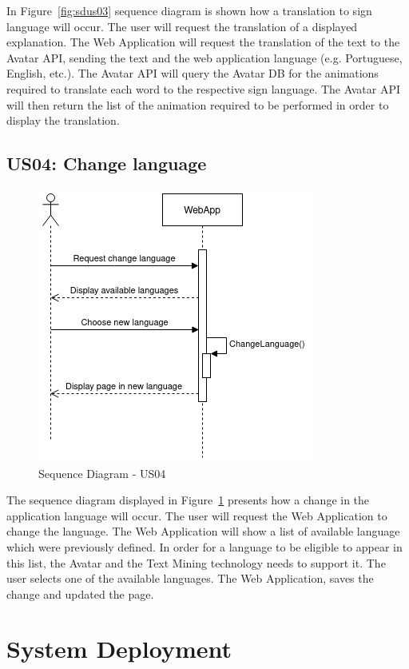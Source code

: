 In Figure~\ref{fig:sdus03} sequence diagram is shown how a translation to sign language will occur.
The user will request the translation of a displayed explanation.
The Web Application will request the translation of the text to the Avatar API, sending the text and the web application language (e.g. Portuguese, English, etc.).
The Avatar API will query the Avatar DB for the animations required to translate each word to the respective sign language.
The Avatar API will then return the list of the animation required to be performed in order to display the translation.

\subsection{US04: Change language}

\begin{figure}[H]
\centering
\includegraphics[scale=0.45]{ch4/assets/US04_SD.png}
\caption[Sequence Diagram US04]{Sequence Diagram - US04}
\label{fig:sdus04}
\end{figure}

The sequence diagram displayed in Figure~\ref{fig:sdus04} presents how a change in the application language will occur.
The user will request the Web Application to change the language.
The Web Application will show a list of available language which were previously defined.
In order for a language to be eligible to appear in this list, the Avatar and the Text Mining technology needs to support it.
The user selects one of the available languages.
The Web Application, saves the change and updated the page.

\section{System Deployment}

